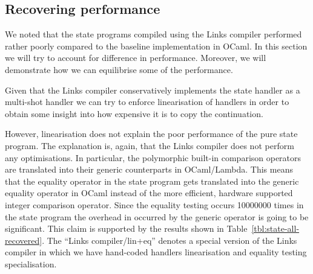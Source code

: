 \documentclass[12pt,mscres,cdtppar,twoside,openright,logo,rightchapter,normalheadings]{infthesis}
\theoremstyle{definition}
\begin{document}

\subsection{Recovering performance}
\label{sec:state-recover}

We noted that the state programs compiled using the Links compiler
performed rather poorly compared to the baseline implementation in
OCaml. In this section we will try to account for difference in
performance. Moreover, we will demonstrate how we can equilibrise some
of the performance.

Given that the Links compiler conservatively implements the state
handler as a multi-shot handler we can try to enforce linearisation of
handlers in order to obtain some insight into how expensive it is to
copy the continuation.

However, linearisation does not explain the poor performance of the
pure state program. The explanation is, again, that the Links compiler
does not perform any optimisations. In particular, the polymorphic
built-in comparison operators are translated into their generic
counterparts in OCaml/Lambda. This means that the equality operator in
the state program gets translated into the generic equality operator
in OCaml instead of the more efficient, hardware supported integer
comparison operator. Since the equality testing occurs 10000000 times
in the state program the overhead in occurred by the generic operator
is going to be significant. This claim is supported by the results
shown in Table~\ref{tbl:state-all-recovered}. The ``Links
compiler/lin+eq'' denotes a special version of the Links compiler in
which we have hand-coded handlers linearisation and equality testing
specialisation.
\end{document}
